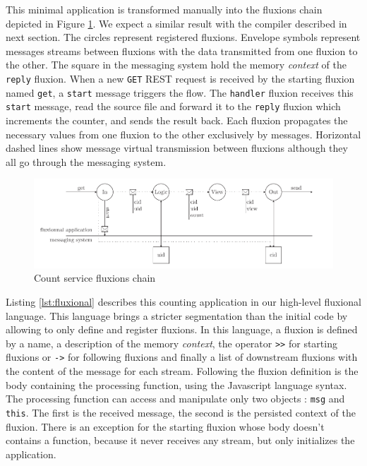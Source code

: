 This minimal application is transformed manually into the fluxions chain depicted in Figure \ref{fig:fluxions}.
We expect a similar result with the compiler described in next section.
The circles represent registered fluxions.
Envelope symbols represent messages streams between fluxions with the data transmitted from one fluxion to the other.
The square in the messaging system hold the memory \textit{context} of the \texttt{reply} fluxion.
When a new \texttt{GET} REST request is received by the starting fluxion named \texttt{get}, a \texttt{start} message triggers the flow.
The \texttt{handler} fluxion receives this \texttt{start} message, read the source file and forward it to the \texttt{reply} fluxion which increments the counter, and sends the result back.
Each fluxion propagates the necessary values from one fluxion to the other exclusively by messages.
Horizontal dashed lines show message virtual transmission between fluxions although they all go through the messaging system.

\begin{figure}[h!]
  \includegraphics[width=\linewidth]{ressources/flux.pdf}
  \caption{Count service fluxions chain}
  \label{fig:fluxions}
\end{figure}

Listing \ref{lst:fluxional} describes this counting application in our high-level fluxional language.
This language brings a stricter segmentation than the initial code by allowing to only define and register fluxions.
In this language, a fluxion is defined by a name, a description of the memory \textit{context}, the operator \texttt{>}\texttt{>} for starting fluxions or \texttt{-}\texttt{>} for following fluxions and finally a list of downstream fluxions with the content of the message for each stream.
Following the fluxion definition is the body containing the processing function, using the Javascript language syntax.
The processing function can access and manipulate only two objects : \texttt{msg} and \texttt{this}.
The first is the received message, the second is the persisted context of the fluxion.
There is an exception for the starting fluxion whose body doesn't contains a function, because it never receives any stream, but only initializes the application.

